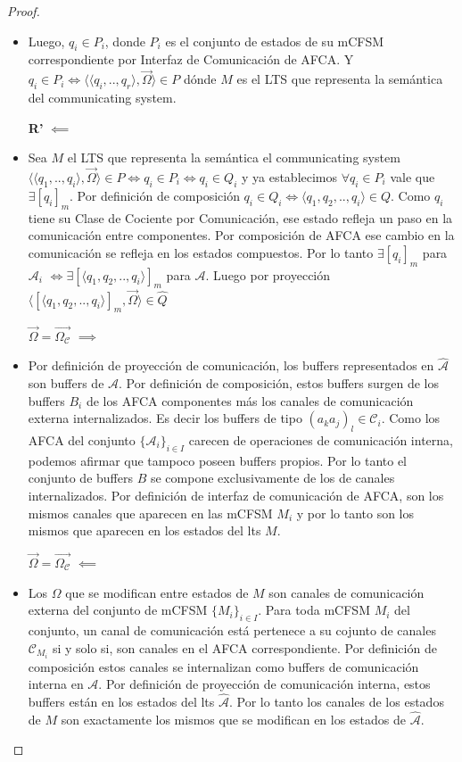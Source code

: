 \begin{proof}
\begin{itemize}
    \item Luego, $q_i \in P_i$, donde $P_i$ es el conjunto de estados de su mCFSM correspondiente por Interfaz de Comunicación de AFCA. Y $q_i \in P_i \iff \langle \langle q_i,..,q_r \rangle, \overrightarrow{\Omega} \rangle \in P$ dónde $M$ es el LTS que representa la semántica del communicating system.
    
    \item[\textbf{R'} $\impliedby$]
    \item Sea $M$ el LTS que representa la semántica el communicating system $\langle \langle q_1,..,q_i \rangle, \overrightarrow{\Omega} \rangle \in P  \iff q_i \in P_i \iff q_i \in Q_i$ y ya establecimos $\forall q_i \in  P_i$ vale que $\exists [q_i]_m$. Por definición de composición $q_i \in Q_i \iff \langle q_1, q_2,.., q_i \rangle \in Q $. Como $q_i$ tiene su Clase de Cociente por Comunicación, ese estado refleja un paso en la comunicación entre componentes. Por composición de AFCA ese cambio en la comunicación se refleja en los estados compuestos. Por lo tanto $\exists [q_i]_m$ para $\mathcal{A}_i$ $\iff \exists [\langle q_1, q_2,.., q_i \rangle]_m$ para $\mathcal{A}$. Luego por proyección $\langle [\langle q_1, q_2,.., q_i \rangle]_m, \overrightarrow{\Omega} \rangle \in \hat{Q}$
    
    \item[\textbf{$\overrightarrow{\Omega} = \overrightarrow{\Omega_\mathcal{C}}$} $\implies$] 
    
    \item Por definición de proyección de comunicación, los buffers representados en $\hat{\mathcal{A}}$ son buffers de $\mathcal{A}$. Por definición de composición, estos buffers surgen de los buffers $B_i$ de los AFCA componentes más los canales de comunicación externa internalizados. Es decir los buffers de tipo $(a_ka_j)_l \in \mathcal{C}_i$. Como los AFCA del conjunto $\{\mathcal{A}_i\}_{i \in I}$ carecen de operaciones de comunicación interna, podemos afirmar que tampoco poseen buffers propios. Por lo tanto el conjunto de buffers $B$ se compone exclusivamente de los de canales internalizados. Por definición de interfaz de comunicación de AFCA, son los mismos canales que aparecen en las mCFSM $M_i$ y por lo tanto son los mismos que aparecen en los estados del lts $M$.

    \item[{$\overrightarrow{\Omega} = \overrightarrow{\Omega_\mathcal{C}}$} $\impliedby$]
    \item Los $\Omega$ que se modifican entre estados de $M$ son canales de comunicación externa del conjunto de mCFSM $\{M_i\}_{i \in I}$. Para toda mCFSM $M_i$ del conjunto, un canal de comunicación está pertenece a su cojunto de canales $\mathcal{C}_{M_i}$ si y solo si, son canales en el AFCA correspondiente. Por definición de composición estos canales se internalizan como buffers de comunicación interna en $\mathcal{A}$. Por definición de proyección de comunicación interna, estos buffers están en los estados del lts $\hat{\mathcal{A}}$. Por lo tanto los canales de los estados de $M$ son exactamente los mismos que se modifican en los estados de $\hat{\mathcal{A}}$.
    

\end{itemize}
\end{proof}
